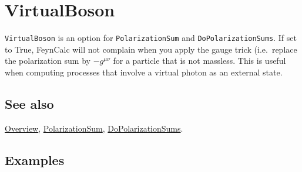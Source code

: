 \documentclass[../FeynCalcManual.tex]{subfiles}
\begin{document}
\hypertarget{virtualboson}{
\section{VirtualBoson}\label{virtualboson}}

\texttt{VirtualBoson} is an option for \texttt{PolarizationSum} and
\texttt{DoPolarizationSums}. If set to True, FeynCalc will not complain
when you apply the gauge trick (i.e.~replace the polarization sum by
\(- g^{\mu \nu}\) for a particle that is not massless. This is useful
when computing processes that involve a virtual photon as an external
state.

\subsection{See also}

\hyperlink{toc}{Overview}, \hyperlink{polarizationsum}{PolarizationSum},
\hyperlink{dopolarizationsums}{DoPolarizationSums}.

\subsection{Examples}
\end{document}
